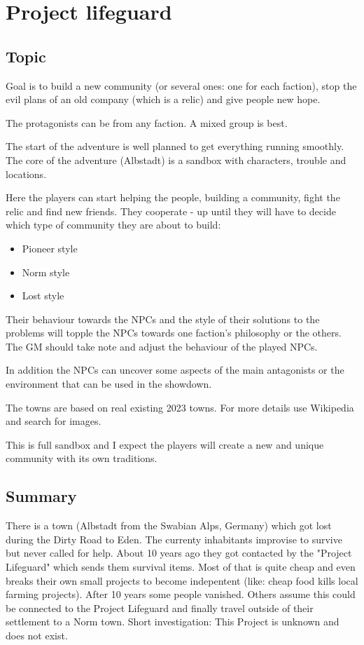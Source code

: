 \chapter{Project lifeguard}
\label{ch:project lifeguard}

\section{Topic}

Goal is to build a new community (or several ones: one for each faction), stop the evil plans of an old company (which is a relic) and give people new hope.

The protagonists can be from any faction. A mixed group is best.

The start of the adventure is well planned to get everything running smoothly. The core of the adventure (Albstadt) is a sandbox with characters, trouble and locations.

Here the players can start helping the people, building a community, fight the relic and find new friends. They cooperate - up until they will have to decide which type of community they are about to build:

\begin{itemize}
    \item Pioneer style
    \item Norm style
    \item Lost style
\end{itemize}

Their behaviour towards the NPCs and the style of their solutions to the problems will topple the NPCs towards one faction's philosophy or the others. The GM should take note and adjust the behaviour of the played NPCs.

In addition the NPCs can uncover some aspects of the main antagonists or the environment that can be used in the showdown.

The towns are based on real existing 2023 towns. For more details use Wikipedia and search for images.

This is full sandbox and I expect the players will create a new and unique community with its own traditions.

\section{Summary}

There is a town (Albstadt from the Swabian Alps, Germany) which got lost during the Dirty Road to Eden. The currenty inhabitants improvise to survive but never called for help. About 10 years ago they got contacted by the "Project Lifeguard" which sends them survival items. Most of that is quite cheap and even breaks their own small projects to become indepentent (like: cheap food kills local farming projects). After 10 years some people vanished. Others assume this could be connected to the Project Lifeguard and finally travel outside of their settlement to a Norm town. Short investigation: This Project is unknown and does not exist.


